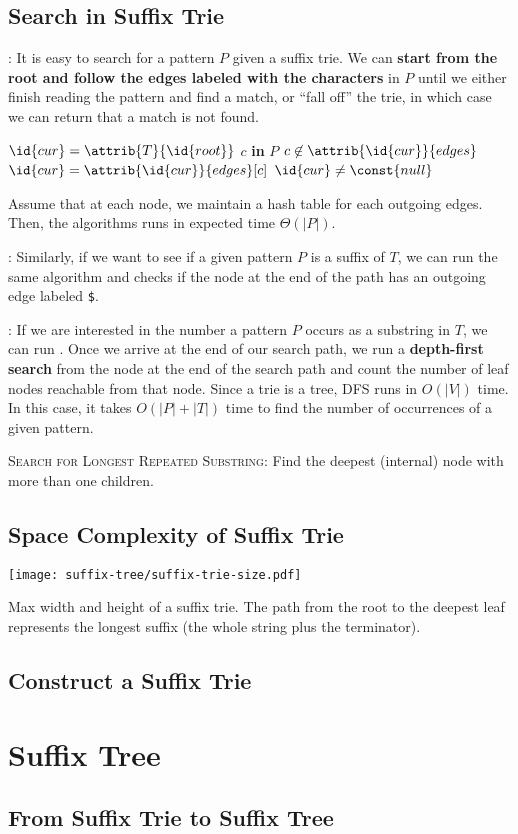 \subsection{Search in Suffix Trie}

: It is easy to search for a pattern $P$ given a suffix trie. We can \textbf{start from the root and follow the edges labeled with the characters} in $P$ until we either finish reading the pattern and find a match, or ``fall off'' the trie, in which case we can return that a match is not found.

\begin{codebox}
    \li $\id{cur} = \attrib{T}{\id{root}}$
    \li \For $c$ \textbf{in} $P$ \Do
        \li \If $c \not\in \attrib{\id{cur}}{edges}$ \Then
            \li \Return {}
        \li \Else $\id{cur} = \attrib{\id{cur}}{edges}[c]$
        \End
    \End
    \li \Return $\id{cur} \neq \const{null}$ 
\end{codebox}

Assume that at each node, we maintain a hash table for each outgoing edges. Then, the algorithms runs in expected time $\Theta(|P|)$.

: Similarly, if we want to see if a given pattern $P$ is a suffix of $T$, we can run the same algorithm and checks if the node at the end of the path has an outgoing edge labeled \texttt{\$}.

: If we are interested in the number a pattern $P$ occurs as a substring in $T$, we can run . Once we arrive at the end of our search path, we run a \textbf{depth-first search} from the node at the end of the search path and count the number of leaf nodes reachable from that node. Since a trie is a tree, DFS runs in $O(|V|)$ time. In this case, it takes $O(|P|+|T|)$ time to find the number of occurrences of a given pattern.

\textsc{Search for Longest Repeated Substring}: Find the deepest (internal) node with more than one children.

\subsection{Space Complexity of Suffix Trie}

\begin{marginfigure}
    \texttt{[image: suffix-tree/suffix-trie-size.pdf]}
    \caption{Max width and height of a suffix trie. The path from the root to the deepest leaf represents the longest suffix (the whole string plus the terminator).}
\end{marginfigure}

\subsection{Construct a Suffix Trie}

\section{Suffix Tree}

\subsection{From Suffix Trie to Suffix Tree}
